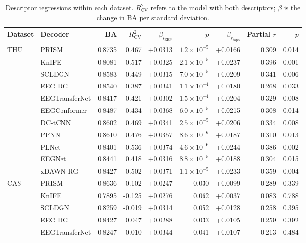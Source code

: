 \begin{table}[H]
\centering
\caption{Descriptor regressions within each dataset. $R^2_\mathrm{CV}$ refers to the model with both descriptors; $\beta$ is the change in BA per standard deviation.}
\label{tab:supp-regressions-dataset}
\scriptsize
\begin{adjustbox}{max width=\textwidth}
\begin{tabular}{@{}llrrrrrrr@{}}
\toprule
Dataset & Decoder & BA & $R^2_\mathrm{CV}$ & $\beta_{s_\mathrm{ERP}}$ & $p$ & $\beta_{r_\mathrm{topo}}$ & Partial $r$ & $p$ \\
\midrule
\multirow{11}{*}{THU} & PRISM & 0.8735 & 0.467 & +0.0313 & $1.2\times10^{-5}$ & +0.0166 & 0.309 & 0.014 \\
 & KnIFE & 0.8081 & 0.517 & +0.0325 & $2.1\times10^{-5}$ & +0.0237 & 0.396 & 0.001 \\
 & SCLDGN & 0.8583 & 0.449 & +0.0315 & $7.0\times10^{-5}$ & +0.0209 & 0.341 & 0.006 \\
 & EEG-DG & 0.8540 & 0.387 & +0.0341 & $1.1\times10^{-4}$ & +0.0180 & 0.268 & 0.033 \\
 & EEGTransferNet & 0.8417 & 0.421 & +0.0302 & $1.5\times10^{-4}$ & +0.0204 & 0.329 & 0.008 \\
 & EEGConformer & 0.8487 & 0.434 & +0.0368 & $6.0\times10^{-5}$ & +0.0215 & 0.308 & 0.014 \\
 & DC-tCNN & 0.8602 & 0.469 & +0.0341 & $2.5\times10^{-5}$ & +0.0206 & 0.334 & 0.008 \\
 & PPNN & 0.8610 & 0.476 & +0.0357 & $8.6\times10^{-6}$ & +0.0187 & 0.310 & 0.013 \\
 & PLNet & 0.8401 & 0.536 & +0.0374 & $4.6\times10^{-6}$ & +0.0244 & 0.386 & 0.002 \\
 & EEGNet & 0.8441 & 0.418 & +0.0316 & $8.8\times10^{-5}$ & +0.0188 & 0.304 & 0.015 \\
 & xDAWN-RG & 0.8427 & 0.502 & +0.0371 & $1.1\times10^{-5}$ & +0.0233 & 0.359 & 0.004 \\
\midrule
\multirow{11}{*}{CAS} & PRISM & 0.8636 & 0.102 & +0.0247 & 0.030 & +0.0099 & 0.289 & 0.339 \\
 & KnIFE & 0.7895 & -0.125 & +0.0276 & 0.062 & +0.0037 & 0.083 & 0.788 \\
 & SCLDGN & 0.8259 & -0.019 & +0.0314 & 0.052 & +0.0128 & 0.258 & 0.395 \\
 & EEG-DG & 0.8427 & 0.047 & +0.0288 & 0.033 & +0.0105 & 0.259 & 0.392 \\
 & EEGTransferNet & 0.8247 & 0.010 & +0.0344 & 0.041 & +0.0107 & 0.213 & 0.484 \\

\end{tabular}
\end{adjustbox}
\end{table}
